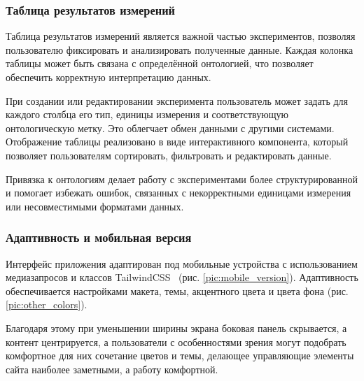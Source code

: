 \subsubsection{Таблица результатов измерений}

Таблица результатов измерений является важной частью экспериментов, позволяя пользователю фиксировать и анализировать полученные данные. Каждая колонка таблицы может быть связана с определённой онтологией, что позволяет обеспечить корректную интерпретацию данных.

При создании или редактировании эксперимента пользователь может задать для каждого столбца его тип, единицы измерения и соответствующую онтологическую метку. Это облегчает обмен данными с другими системами. Отображение таблицы реализовано в виде интерактивного компонента, который позволяет пользователям сортировать, фильтровать и редактировать данные.

Привязка к онтологиям делает работу с экспериментами более структурированной и помогает избежать ошибок, связанных с некорректными единицами измерения или несовместимыми форматами данных.

\subsubsection{Адаптивность и мобильная версия}

Интерфейс приложения адаптирован под мобильные устройства с использованием медиазапросов и классов TailwindCSS~\cite{Library:TailwindCSS} (рис. \ref{pic:mobile_version}). Адаптивность обеспечивается настройками макета, темы, акцентного цвета и цвета фона (рис. \ref{pic:other_colors}).

Благодаря этому при уменьшении ширины экрана боковая панель скрывается, а контент центрируется, а пользователи с особенностями зрения могут подобрать комфортное для них сочетание цветов и темы, делающее управляющие элементы сайта наиболее заметными, а работу комфортной.

